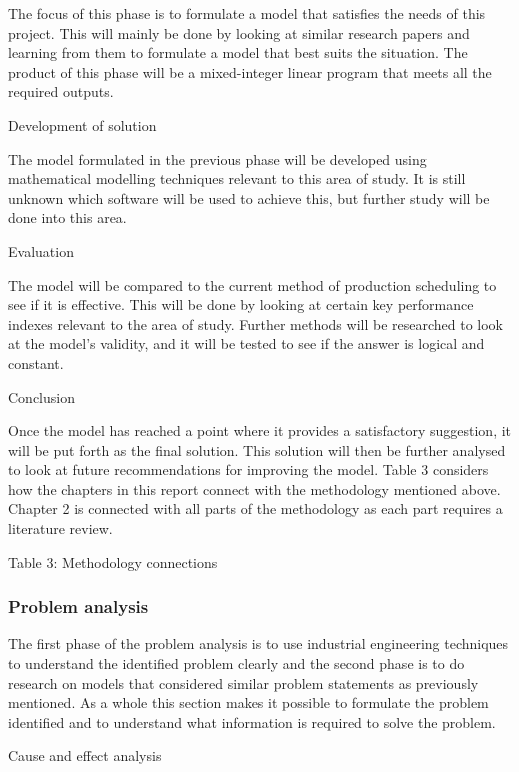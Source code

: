\documentclass[a4paper,11pt,fleqn]{report}
\begin{document}
            The focus of this phase is to formulate a model that satisfies the needs of this project. This will mainly be done by looking at similar research papers and learning from them to formulate a model that best suits the situation. The product of this phase will be a mixed-integer linear program that meets all the required outputs.
            
        Development of solution
        
            The model formulated in the previous phase will be developed using mathematical modelling techniques relevant to this area of study. It is still unknown which software will be used to achieve this, but further study will be done into this area.
            
        Evaluation
        
                The model will be compared to the current method of production scheduling to see if it is effective. This will be done by looking at certain key performance indexes relevant to the area of study. Further methods will be researched to look at the model’s validity, and it will be tested to see if the answer is logical and constant.
                
        Conclusion
                
                Once the model has reached a point where it provides a satisfactory suggestion, it will be put forth as the final solution. This solution will then be further analysed to look at future recommendations for improving the model. Table 3 considers how the chapters in this report connect with the methodology mentioned above. Chapter 2 is connected with all parts of the methodology as each part requires a literature review.
                
                Table 3: Methodology connections
            \subsubsection{Problem analysis}
            The first phase of the problem analysis is to use industrial engineering techniques to understand the identified problem clearly and the second phase is to do research on models that considered similar problem statements as previously mentioned. As a whole this section makes it possible to formulate the problem identified and to understand what information is required to solve the problem.
            
            Cause and effect analysis
            
\end{document}
